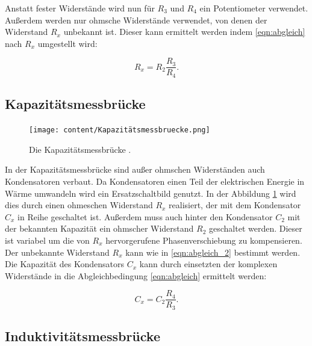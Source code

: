 Anstatt fester Widerstände wird nun für $R_3$ und $R_4$ ein Potentiometer verwendet.
Außerdem werden nur ohmsche Widerstände verwendet, von denen der Widerstand $R_x$ unbekannt ist.
Dieser kann ermittelt werden indem \eqref{eqn:abgleich} nach $R_x$ umgestellt wird:

\begin{equation}
    R_x = R_2 \frac{R_3}{R_4}.
    \label{eqn:abgleich_2}
\end{equation}

\subsection{Kapazitätsmessbrücke}

\begin{figure}
    \centering
    \texttt{[image: content/Kapazitätsmessbruecke.png]}
    \caption{Die Kapazitätsmessbrücke \cite[S. 220]{anleitung}.}
     \label{fig:kapaz}
\end{figure}

In der Kapazitätsmessbrücke sind außer ohmschen Widerständen auch Kondensatoren verbaut.
Da Kondensatoren einen Teil der elektrischen Energie in Wärme umwandeln wird ein Ersatzschaltbild genutzt.
In der Abbildung \ref{fig:kapaz} wird dies durch einen ohmeschen Widerstand $R_x$ realisiert, der mit dem Kondensator $C_x$ in Reihe geschaltet ist.
Außerdem muss auch hinter den Kondensator $C_2$ mit der bekannten Kapazität ein ohmscher Widerstand $R_2$ geschaltet werden.
Dieser ist variabel um die von $R_x$ hervorgerufene Phasenverschiebung zu kompensieren.
Der unbekannte Widerstand $R_x$ kann wie in \eqref{eqn:abgleich_2} bestimmt werden.
Die Kapazität des Kondensators $C_x$ kann durch einsetzten der komplexen Widerstände in die
Abgleichbedingung \eqref{eqn:abgleich} ermittelt werden:

\begin{equation}
    C_x = C_2 \frac{R_4}{R_3}.
\end{equation}

\subsection{Induktivitätsmessbrücke}

